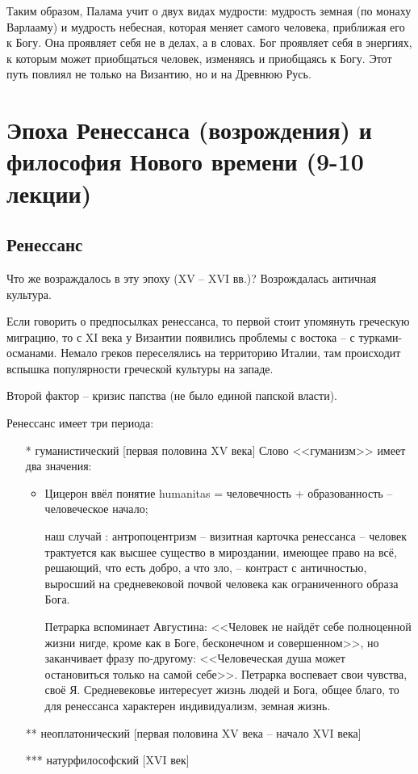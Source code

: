\documentclass[a4paper, 12pt]{book} %
\begin{document}
Таким образом, Палама учит о двух видах  мудрости: мудрость земная (по монаху Варлааму) и мудрость небесная, которая меняет самого человека, приближая его к Богу. Она проявляет себя не в делах, а в словах. Бог проявляет себя в энергиях, к которым может приобщаться человек, изменяясь и приобщаясь к Богу. Этот путь повлиял не только на Византию, но и на Древнюю Русь.

\section{Эпоха Ренессанса (возрождения) и философия Нового времени (9-10 лекции)}
\subsection{Ренессанс}
Что же возраждалось в эту эпоху (XV -- XVI вв.)? Возрождалась античная культура. 

Если говорить о предпосылках ренессанса, то первой стоит упомянуть греческую миграцию, то с XI века у Византии появились проблемы с востока -- с турками-османами. Немало греков переселялись на территорию Италии, там происходит вспышка популярности греческой культуры на западе.

Второй фактор -- кризис папства (не было единой папской власти).

Ренессанс имеет три периода:
\begin{itemize}
\item[*] гуманистический [первая половина XV века]
Слово <<гуманизм>> имеет два значения:
\begin{itemize}
\item Цицерон ввёл понятие humanitas = человечность + образованность -- человеческое начало;
\item [наш случай]: антропоцентризм -- визитная карточка ренессанса -- человек трактуется как высшее существо в мироздании, имеющее право на всё, решающий, что есть добро, а что зло, -- контраст с античностью, выросший на средневековой почвой человека как ограниченного образа Бога.

Петрарка вспоминает Августина: <<Человек не найдёт себе полноценной жизни нигде, кроме как в Боге, бесконечном и совершенном>>, но заканчивает фразу по-другому: <<Человеческая душа может остановиться только на самой себе>>. Петрарка воспевает свои чувства, своё Я. Средневековье интересует жизнь людей и Бога, общее благо, то для ренессанса характерен индивидуализм, земная жизнь. 
\end{itemize}
\item[**] неоплатонический [первая половина XV века -- начало XVI века]
\item[***] натурфилософский [XVI век]
\end{itemize}
\end{document}
